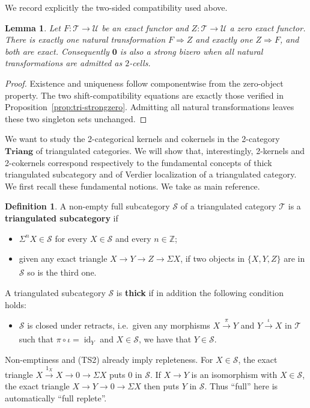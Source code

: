 \documentclass[11pt,reqno,a4paper]{amsart}
\newtheorem{lemma}[theorem]{Lemma}
\theoremstyle{definition}
\newtheorem{definition}[theorem]{Definition}
\theoremstyle{remark}
\newcommand{\T}{\mathcal{T}}
\renewcommand{\S}{\mathcal{S}}
\newcommand{\U}{\mathcal{U}}
\newcommand{\0}{\mathbf{0}}
\renewcommand{\1}{\mathbf{1}}
\newcommand{\Triang}{\mathbf{Triang}}
\newcommand{\id}[1]{\operatorname{id}_{#1}}
\newcommand{\aar}[2][]{\xrightarrow[#1]{#2}}
\begin{document}
We record explicitly the two-sided compatibility used above.

\begin{lemma}\label{lemmanattozeroisexact}
Let $F:\T\to\U$ be an exact functor and $Z:\T\to\U$ a zero
exact functor. There is exactly one natural transformation
$F\Rightarrow Z$ and exactly one $Z\Rightarrow F$, and both are
exact. Consequently $\0$ is also a strong bizero when all natural
transformations are admitted as $2$-cells.
\end{lemma}
\begin{proof}
Existence and uniqueness follow componentwise from the zero-object
property. The two shift-compatibility equations are exactly those
verified in Proposition~\ref{prop:tri-strongzero}. Admitting all
natural transformations leaves these two singleton sets unchanged.
\end{proof}

We want to study the 2-categorical kernels and cokernels in the 2-category $\Triang$ of triangulated categories. We will show that, interestingly, 2-kernels and 2-cokernels correspond respectively to the fundamental concepts of thick triangulated subcategory and of Verdier localization of a triangulated category. We first recall these fundamental notions. We take \cite{StacksTri} as main reference.

\begin{definition}
    A non-empty full subcategory $\S$ of a triangulated category $\T$ is a \textbf{triangulated subcategory} if
\begin{itemize}
\item [(TS1)] $\Sigma^n X\in \S$ for every $X\in \S$ and every $n\in \mathbb{Z}$;
\item [(TS2)] given any exact triangle $X \aar{} Y \aar{} Z \aar{} \Sigma X$, if two objects in $\{X,Y,Z\}$ are in $\S$ so is the third one.
\end{itemize}
A triangulated subcategory $\S$ is \textbf{thick} if in addition the following condition holds:
\begin{itemize}
\item [(TS3)] $\S$ is closed under retracts, i.e.\ given any morphisms $X \aar{\pi} Y$ and $Y\aar{\iota} X$ in $\T$ such that $\pi \circ \iota =\id{Y}$ and $X\in \S$, we have that $Y\in \S$.
\end{itemize}
\end{definition}

Non-emptiness and (TS2) already imply repleteness. For $X\in\S$,
the exact triangle $X\xrightarrow{1_X}X\to0\to\Sigma X$ puts
$0$ in $\S$. If $X\to Y$ is an isomorphism with $X\in\S$,
the exact triangle $X\to Y\to0\to\Sigma X$ then puts $Y$ in
$\S$. Thus ``full'' here is automatically ``full replete''.
\end{document}
